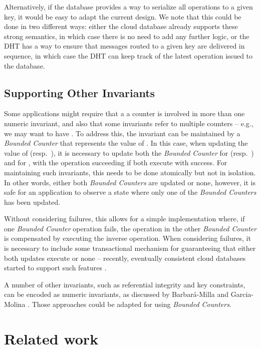 \documentclass[conference]{IEEEtran}
\newcommand{\InvCounter}{\emph{Bounded Counter}}
\newcommand{\InvCounters}{\emph{Bounded Counters}}
\begin{document}
Alternatively, if the database provides a way to serialize 
all operations to a given key, it would be easy to adapt the current design. 
We note that this could be done in two different ways: either the 
cloud database already supports these strong semantics, 
in which case there is no need to add any further logic, 
or the DHT has a way to ensure that messages routed to a given 
key are delivered in sequence, in which case the DHT can keep 
track of the latest operation issued to the database.

\subsection{Supporting Other Invariants}

Some applications might require that a
a counter is involved in more than one numeric invariant, and also that some
invariants refer to multiple counters -- e.g., we may want to have .
To address this, the invariant  can be maintained by a \InvCounter{} that represents the value of .
In this case, when updating the value of  (resp.\ ), it is necessary to update 
both the \InvCounter{} for  (resp.\ ) and for , with the operation succeeding 
if both execute with success. 
For maintaining such invariants, this needs to be done atomically but not in isolation. In other words,
either both \InvCounters{} are updated or none, however, it is safe for an application to observe 
a state where only one of the \InvCounters{} has been updated.

Without considering failures, this allows for a simple implementation where, if one
\InvCounter{} operation fails, the operation in the other \InvCounter{} is  
compensated \cite{sagas} by executing the inverse operation.
When considering failures, it is necessary to include some transactional mechanism 
for guaranteeing that either both updates execute or none -- recently, eventually consistent
cloud databases started to support such features \cite{cops,eiger}.

A number of other invariants, such as referential integrity and 
key constraints, can be encoded as numeric invariants,
as discussed by Barbará-Milla and Garcia-Molina \cite{demarcation}.
Those approaches could be adapted for using \InvCounters{}.







\section{Related work}\label{sec:related}
\label{sec:related-work}
\end{document}
